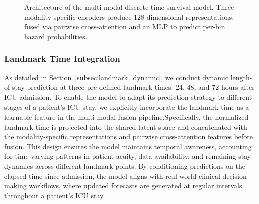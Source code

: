 \documentclass[10pt, a4paper]{article}
\begin{document}
\begin{figure}[htbp]
{%
}
\caption{Architecture of the multi-modal discrete-time survival model. Three modality-specific encoders produce 128-dimensional representations, fused via pairwise cross-attention and an MLP to predict per-bin hazard probabilities.}
\label{fig:architecture}
\end{figure}

\subsubsection{Landmark Time Integration}
As detailed in Section~\ref{subsec:landmark_dynamic}, we conduct dynamic length-of-stay prediction at three pre-defined landmark times: 24, 48, and 72 hours after ICU admission. To enable the model to adapt its prediction strategy to different stages of a patient’s ICU stay, we explicitly incorporate the landmark time as a learnable feature in the multi-modal fusion pipeline.Specifically, the normalized landmark time is projected into the shared latent space and concatenated with the modality-specific representations and pairwise cross-attention features before fusion. This design ensures the model maintains temporal awareness, accounting for time-varying patterns in patient acuity, data availability, and remaining stay dynamics across different landmark points. By conditioning predictions on the elapsed time since admission, the model aligns with real-world clinical decision-making workflows, where updated forecasts are generated at regular intervals throughout a patient’s ICU stay.
\end{document}
